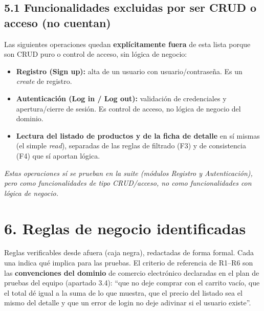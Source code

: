 \subsection*{5.1 Funcionalidades excluidas por ser CRUD o acceso (no cuentan)}

Las siguientes operaciones quedan \textbf{explícitamente fuera} de esta lista porque son
CRUD puro o control de acceso, sin lógica de negocio:

\begin{itemize}
  \item \textbf{Registro (Sign up):} alta de un usuario con usuario/contraseña. Es un
        \emph{create} de registro.
  \item \textbf{Autenticación (Log in / Log out):} validación de credenciales y
        apertura/cierre de sesión. Es control de acceso, no lógica de negocio del
        dominio.
  \item \textbf{Lectura del listado de productos y de la ficha de detalle} en sí mismas
        (el simple \emph{read}), separadas de las reglas de filtrado (F3) y de
        consistencia (F4) que sí aportan lógica.
\end{itemize}

\noindent\emph{Estas operaciones sí se prueban en la suite (módulos Registro y
Autenticación), pero como funcionalidades de tipo CRUD/acceso, no como funcionalidades
con lógica de negocio.}

\FloatBarrier
\section*{6. Reglas de negocio identificadas}

Reglas verificables desde afuera (caja negra), redactadas de forma formal. Cada una
indica qué implica para las pruebas. El criterio de referencia de R1–R6 son las
\textbf{convenciones del dominio} de comercio electrónico declaradas en el plan de
pruebas del equipo (apartado 3.4): ``que no deje comprar con el carrito vacío, que el
total dé igual a la suma de lo que muestra, que el precio del listado sea el mismo del
detalle y que un error de login no deje adivinar si el usuario existe''.


